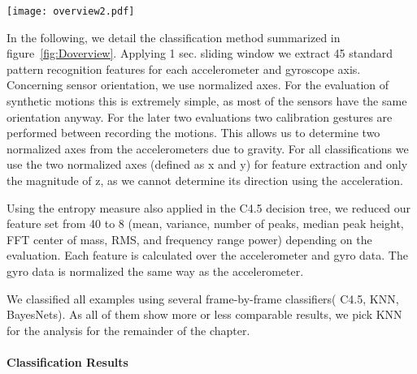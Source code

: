 \begin{figure*}[t]
\centering   
\texttt{[image: overview2.pdf]}

\caption[Classification overview]{Overview about the classification method used, showing
the heuristic cut-off.}
\label{fig:Doverview}
\end{figure*}
In the following, we detail the classification method summarized in figure~\ref{fig:Doverview}.
Applying 1 sec. sliding window we extract 45 standard 
pattern recognition features for each accelerometer and gyroscope axis.
Concerning sensor orientation, we use normalized axes. For the evaluation of synthetic motions
this is extremely simple, as most of the sensors have the same
orientation anyway. 
For the later two evaluations two calibration gestures are performed
between recording 
the motions. This allows us to determine two normalized axes from the
accelerometers due to gravity. For all classifications we use the two normalized axes 
(defined as x and y) for feature extraction and only the magnitude of
z, as we cannot determine its direction using the acceleration. 

Using the entropy measure also applied in the C4.5 decision tree, we
reduced our feature set from  40 to 8  (mean, variance, number of
peaks, median peak height, FFT center of mass, RMS, and frequency
range power) depending on the evaluation. Each feature is calculated over the accelerometer and gyro data. 
The gyro data is normalized the same way as the accelerometer.

We classified all  examples using several frame-by-frame classifiers( C4.5,
KNN, BayesNets). As all of them show more or less comparable results, we pick KNN for the analysis for the remainder of the chapter.

\paragraph{Classification Results}


